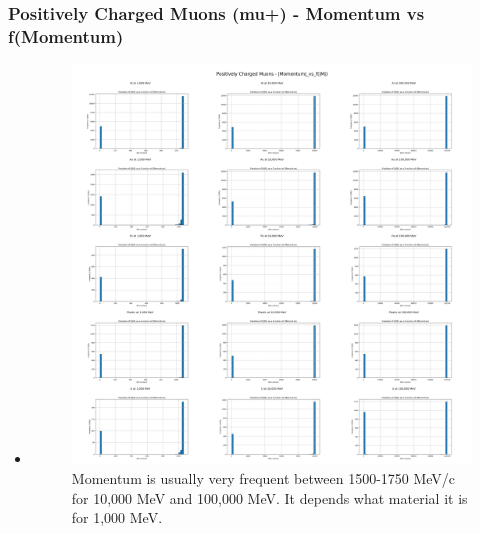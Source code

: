\documentclass[aspectratio-169]{beamer}
\begin{document}
\begin{frame}
\frametitle{Positively Charged Muons (mu+) - Momentum vs f(Momentum)}
\begin{itemize}
    \item 
    \begin{minipage}{0.5\textwidth}
        \begin{figure}
            \centering
            \includegraphics[width=\textwidth]{Combined Plots/|Momentum|_vs_f(|M|)_mu+.png}
            \footnotesize{Momentum is usually very frequent between 1500-1750 MeV/c for 10,000 MeV and 100,000 MeV. It depends what material it is for 1,000 MeV.}
        \end{figure}
    \end{minipage}
\end{itemize}
\end{frame}

\end{document}
